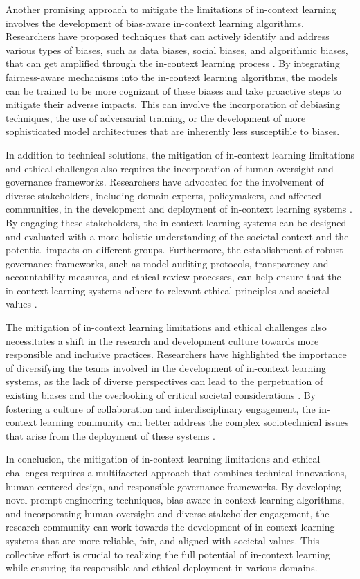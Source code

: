 \documentclass[11pt]{article}
\begin{document}
Another promising approach to mitigate the limitations of in-context learning involves the development of bias-aware in-context learning algorithms. Researchers have proposed techniques that can actively identify and address various types of biases, such as data biases, social biases, and algorithmic biases, that can get amplified through the in-context learning process \cite{ref349}. By integrating fairness-aware mechanisms into the in-context learning algorithms, the models can be trained to be more cognizant of these biases and take proactive steps to mitigate their adverse impacts. This can involve the incorporation of debiasing techniques, the use of adversarial training, or the development of more sophisticated model architectures that are inherently less susceptible to biases.

In addition to technical solutions, the mitigation of in-context learning limitations and ethical challenges also requires the incorporation of human oversight and governance frameworks. Researchers have advocated for the involvement of diverse stakeholders, including domain experts, policymakers, and affected communities, in the development and deployment of in-context learning systems \cite{ref351}. By engaging these stakeholders, the in-context learning systems can be designed and evaluated with a more holistic understanding of the societal context and the potential impacts on different groups. Furthermore, the establishment of robust governance frameworks, such as model auditing protocols, transparency and accountability measures, and ethical review processes, can help ensure that the in-context learning systems adhere to relevant ethical principles and societal values \cite{ref352}.

The mitigation of in-context learning limitations and ethical challenges also necessitates a shift in the research and development culture towards more responsible and inclusive practices. Researchers have highlighted the importance of diversifying the teams involved in the development of in-context learning systems, as the lack of diverse perspectives can lead to the perpetuation of existing biases and the overlooking of critical societal considerations \cite{ref353}. By fostering a culture of collaboration and interdisciplinary engagement, the in-context learning community can better address the complex sociotechnical issues that arise from the deployment of these systems \cite{ref354}.

In conclusion, the mitigation of in-context learning limitations and ethical challenges requires a multifaceted approach that combines technical innovations, human-centered design, and responsible governance frameworks. By developing novel prompt engineering techniques, bias-aware in-context learning algorithms, and incorporating human oversight and diverse stakeholder engagement, the research community can work towards the development of in-context learning systems that are more reliable, fair, and aligned with societal values. This collective effort is crucial to realizing the full potential of in-context learning while ensuring its responsible and ethical deployment in various domains.
\end{document}
